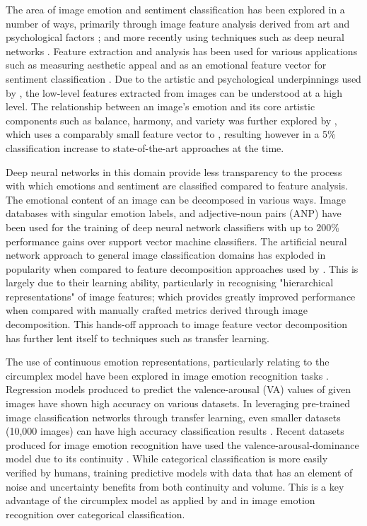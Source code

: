 \documentclass{article}
\begin{document}
The area of image emotion and sentiment classification has been explored in a number of ways, primarily through image feature analysis derived from art and psychological factors \citep{machajdik2010affective}; and more recently using techniques such as deep neural networks \citep{chen2015learning, kim2018building}.
Feature extraction and analysis has been used for various applications such as measuring aesthetic appeal \citep{den2010using,den2010comparing,den2011evolving} and as an emotional feature vector for sentiment classification \citep{machajdik2010affective}.
Due to the artistic and psychological underpinnings used by \citet{machajdik2010affective}, the low-level features extracted from images can be understood at a high level.
The relationship between an image's emotion and its core artistic components such as balance, harmony, and variety was further explored by \citet{zhao2014exploring}, which uses a comparably small feature vector to \citet{machajdik2010affective}, resulting however in a 5\% classification increase to state-of-the-art approaches at the time.

Deep neural networks in this domain provide less transparency to the process with which emotions and sentiment are classified compared to feature analysis.
The emotional content of an image can be decomposed in various ways.
Image databases with singular emotion labels, and adjective-noun pairs (ANP) have been used for the training of deep neural network classifiers \citep{chen2014deepsentibank, yang2018visual} with up to 200\% performance gains over support vector machine classifiers.
The artificial neural network approach to general image classification domains has exploded in popularity when compared to feature decomposition approaches used by \citet{machajdik2010affective}.
This is largely due to their learning ability, particularly in recognising "hierarchical representations" \citep{lipton2015critical} of image features; which provides greatly improved performance when compared with manually crafted metrics derived through image decomposition.
This hands-off approach to image feature vector decomposition has further lent itself to techniques such as transfer learning.

The use of continuous emotion representations, particularly relating to the circumplex model have been explored in image emotion recognition tasks \citep{kim2018building, zhao2016predicting, zhao2017continuous}.
Regression models produced to predict the valence-arousal (VA) values of given images have shown high accuracy on various datasets.
In leveraging pre-trained image classification networks through transfer learning, even smaller datasets (10,000 images) can have high accuracy classification results \citep{kim2018building}.
Recent datasets produced for image emotion recognition have used the valence-arousal-dominance model due to its continuity \citep{zhao2016predicting}.
While categorical classification is more easily verified by humans, training predictive models with data that has an element of noise and uncertainty benefits from both continuity and volume.
This is a key advantage of the circumplex model as applied by \citet{kim2018building} and \citet{zhao2016predicting} in image emotion recognition over categorical classification.
\end{document}
